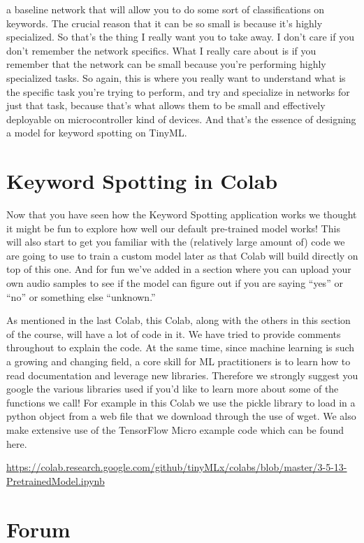 a baseline network that will allow you to do some sort of classifications
on keywords.
The crucial reason that it can be so small
is because it's highly specialized.
So that's the thing I really want you to take away.
I don't care if you don't remember the network specifics.
What I really care about is if you remember
that the network can be small because you're performing highly specialized
tasks.
So again, this is where you really want to understand
what is the specific task you're trying to perform,
and try and specialize in networks for just that task,
because that's what allows them to be small and effectively deployable
on microcontroller kind of devices.
And that's the essence of designing a model for keyword spotting on TinyML.


\section{Keyword Spotting in Colab}

Now that you have seen how the Keyword Spotting application works we thought it might be fun to explore how well our default pre-trained model works! This will also start to get you familiar with the (relatively large amount of) code we are going to use to train a custom model later as that Colab will build directly on top of this one. And for fun we’ve added in a section where you can upload your own audio samples to see if the model can figure out if you are saying “yes” or “no” or something else “unknown.”

As mentioned in the last Colab, this Colab, along with the others in this section of the course, will have a lot of code in it. We have tried to provide comments throughout to explain the code. At the same time, since machine learning is such a growing and changing field, a core skill for ML practitioners is to learn how to read documentation and leverage new libraries. Therefore we strongly suggest you google the various libraries used if you’d like to learn more about some of the functions we call! For example in this Colab we use the pickle library to load in a python object from a web file that we download through the use of wget. We also make extensive use of the TensorFlow Micro example code which can be found here.

\url{https://colab.research.google.com/github/tinyMLx/colabs/blob/master/3-5-13-PretrainedModel.ipynb}

\section{Forum}

